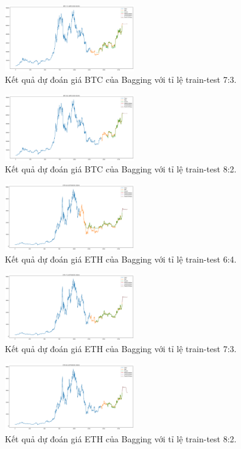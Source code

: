 \documentclass{ieeeojies}
\begin{document}
\begin{figure}[h]
    \centering
    \includegraphics[width=0.5\textwidth]{bibliography/pictures/5.png}
    \caption{Kết quả dự đoán giá BTC của Bagging với tỉ lệ train-test 7:3.}
\end{figure}
\begin{figure}[h]
    \centering
    \includegraphics[width=0.5\textwidth]{bibliography/pictures/6.png}
    \caption{Kết quả dự đoán giá BTC của Bagging với tỉ lệ train-test 8:2.}
\end{figure}
\begin{figure}[h]
    \centering
    \includegraphics[width=0.5\textwidth]{bibliography/pictures/7.png}
    \caption{Kết quả dự đoán giá ETH của Bagging với tỉ lệ train-test 6:4.}
\end{figure}
\begin{figure}[h]
    \centering
    \includegraphics[width=0.5\textwidth]{bibliography/pictures/9.png}
    \caption{Kết quả dự đoán giá ETH của Bagging với tỉ lệ train-test 7:3.}
\end{figure}
\begin{figure}[h]
    \centering
    \includegraphics[width=0.5\textwidth]{bibliography/pictures/10.png}
    \caption{Kết quả dự đoán giá ETH của Bagging với tỉ lệ train-test 8:2.}
\end{figure}
\end{document}
